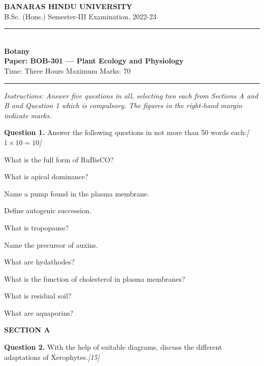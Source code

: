 \documentclass[11pt,a4paper]{article}
\newcommand{\pts}[1]{\hfill   \textit{[#1]}}
\begin{document}
\begin{center}
  {\large\bfseries BANARAS HINDU UNIVERSITY}\\[2pt]
  {\normalsize B.Sc. (Hons.) Semester-III Examination, 2022-23}\\[6pt]
  \rule{0.8\linewidth}{0.5pt}\\[6pt]
  {\large\bfseries Botany}\\[4pt]
  {\large\bfseries Paper: BOB-301 --- Plant Ecology and Physiology}\\[4pt]
  {\normalsize Time: Three Hours \hfill Maximum Marks: 70}
\end{center}

\rule{\linewidth}{0.4pt}

\smallskip



\noindent   \textit{Instructions: Answer five questions in all, selecting two each from Sections A and B and Question 1 which is compulsory. The figures in the right-hand margin indicate marks.}

\bigskip

\medskip


\noindent   \textbf{Question 1.} Answer the following questions in not more than 50 words each:\pts{$1  \times 10 = 10$}

\begin{parts}
  \item What is the full form of RuBisCO?
  \item What is apical dominance?
  \item Name a pump found in the plasma membrane.
  \item Define autogenic succession.
  \item What is tropopause?
  \item Name the precursor of auxins.
  \item What are hydathodes?
  \item What is the function of cholesterol in plasma membranes?
  \item What is residual soil?
  \item What are aquaporins?
\end{parts}

\bigskip

\begin{center}
   \textbf{SECTION A}
\end{center}
\medskip

\medskip


\noindent   \textbf{Question 2.} With the help of suitable diagrams, discuss the different adaptations of Xerophytes.\pts{15}
\end{document}
